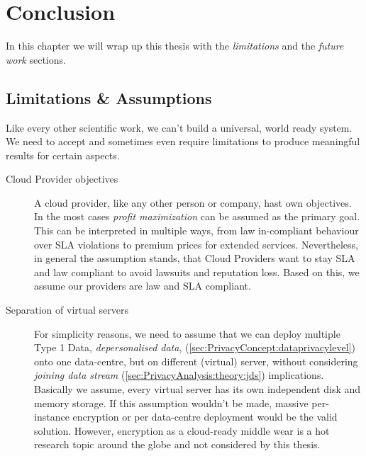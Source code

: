 
\chapter{Conclusion}
\label{ch:Conclusion}

In this chapter we will wrap up this thesis with the \textit{limitations} and the \textit{future work} sections.

\section{Limitations \& Assumptions}
\label{sec:Conculsion:limits}

Like every other scientific work, we can't build a universal, world ready system. We need to accept and sometimes even require limitations to produce meaningful results for certain aspects.

\begin{description}
	\item[Cloud Provider objectives]
	A cloud provider, like any other person or company, hast own objectives. In the most cases \textit{profit maximization} can be assumed as the primary goal. This can be interpreted in multiple ways, from law in-compliant behaviour over SLA violations to premium prices for extended services. Nevertheless, in general the assumption stands, that Cloud Providers want to stay SLA and law compliant to avoid lawsuits and reputation loss. Based on this, we assume our providers are law and SLA compliant.
\end{description}	


\begin{description}
	\item[Separation of virtual servers]
	For simplicity reasons, we need to assume that we can deploy multiple Type 1 Data, \textit{depersonalised data}, (\autoref{sec:PrivacyConcept:dataprivacylevel}) onto one data-centre, but on different (virtual) server, without considering \textit{joining data stream} (\autoref{sec:PrivacyAnalysis:theory:jds}) implications. Basically we assume, every virtual server has its own independent disk and memory storage.	If this assumption wouldn’t be made, massive per-instance encryption or per data-centre deployment would be the valid solution. However, encryption as a cloud-ready middle wear is a hot research topic around the globe and not considered by this thesis.
\end{description}


